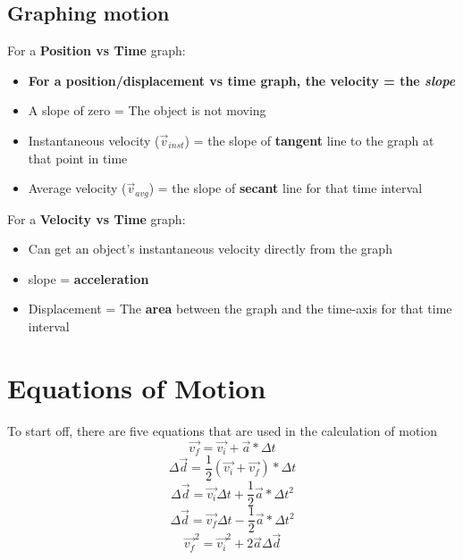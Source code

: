 \documentclass[10pt]{report}
\theoremstyle{remark}
\begin{document}
\subsection{Graphing motion}
For a \textbf{Position vs Time} graph:
\begin{itemize}
\item \textbf{For a position/displacement vs time graph, the velocity = the \textit{slope}} 
\item A slope of zero = The object is not moving
\item Instantaneous velocity ($\vec{v}_{inst}$) = the slope of \textbf{tangent} line to the graph at that point in time
\item Average velocity ($\vec{v}_{avg}$) = the slope of \textbf{secant} line for that time interval
\end{itemize}
For a \textbf{Velocity vs Time} graph:
\begin{itemize}
    \item Can get an object's instantaneous velocity directly from the graph
    \item slope = \textbf{acceleration}
    \item Displacement = The \textbf{area} between the graph and the time-axis for that time interval
\end{itemize}

\newpage
\section{Equations of Motion}
To start off, there are five equations that are used in the calculation of motion
\[
    \vec{v_{f}} = \vec{v_{i}} + \vec{a}*\Delta t
\]
\[
    \Delta\vec{d} = \frac{1}{2}(\vec{v_{i}} + \vec{v_{f}}) * \Delta t
\]
\[
    \Delta\vec{d} = \vec{v_{i}}\Delta t + \frac{1}{2}\vec{a} * \Delta t^2
\]
\[
    \Delta\vec{d} = \vec{v_{f}}\Delta t - \frac{1}{2}\vec{a} * \Delta t^2
\]
\[
    \vec{v_{f}}^2 = \vec{v_{i}}^2 + 2 \vec{a} \Delta \vec{d} 
\]
\end{document}
